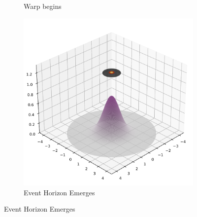 \documentclass[12pt]{article}
\begin{document}
\begin{figure}[H]
\begin{subfigure}[b]{0.3\textwidth}
    \caption{Warp begins}
  \end{subfigure}
  \hfill
  \begin{subfigure}[b]{0.3\textwidth}
    \includegraphics[width=\textwidth]{eh_appears.pdf}
    \caption{Event Horizon Emerges}
  \end{subfigure}

  \par\vspace{0.5em}


\end{figure}
\end{document}
